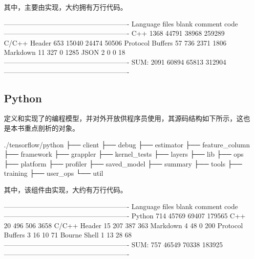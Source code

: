 \begin{content}
其中，主要由实现，大约拥有万行代码。

\begin{leftbar}
\begin{python}[caption={Core代码统计}]
-------------------------------------------------------
Language             files    blank   comment      code
-------------------------------------------------------
C++                   1368    44791     38968    259289
C/C++ Header           653    15040     24474     50506
Protocol Buffers        57      736      2371      1806
Markdown                11      327         0      1285
JSON                     2        0         0        18
-------------------------------------------------------
SUM:                  2091    60894     65813    312904
-------------------------------------------------------
\end{python}
\end{leftbar}

\subsection{Python}

定义和实现了\tf{}的编程模型，并对外开放供程序员使用，其源码结构如下所示，这也是本书重点剖析的对象。

\begin{leftbar}
\begin{c++}[caption={Python源码结构}]
./tensorflow/python
├── client
├── debug
├── estimator
├── feature_column
├── framework
├── grappler
├── kernel_tests
├── layers
├── lib
├── ops
├── platform
├── profiler
├── saved_model
├── summary
├── tools
├── training
├── user_ops
└── util
\end{c++}
\end{leftbar}

其中，该组件由实现，大约有万行代码。

\begin{leftbar}
\begin{python}[caption={Python代码统计}]
-------------------------------------------------------
Language            files     blank   comment      code
-------------------------------------------------------
Python                714     45769     69407    179565
C++                    20       496       506      3658
C/C++ Header           15       207       387       363
Markdown                4        48         0       200
Protocol Buffers        3        16        10        71
Bourne Shell            1        13        28        68
-------------------------------------------------------
SUM:                  757     46549     70338    183925
-------------------------------------------------------
\end{python}
\end{leftbar}


\end{content}
